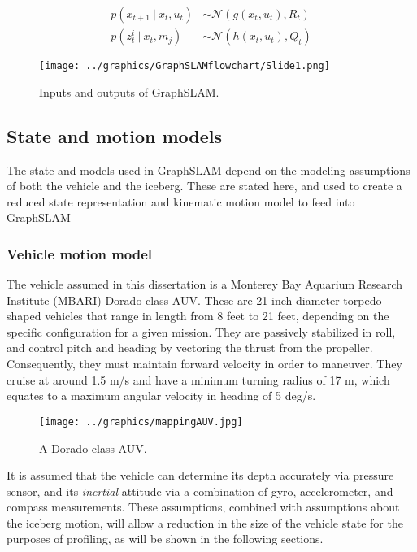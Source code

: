\begin{align}
p\left(x_{t+1}~|~x_t,u_t\right) & \sim \mathcal{N}\left(g(x_t,u_t), R_t\right) \\
p\left(z^i_{t}~|~x_t,m_j\right) & \sim \mathcal{N}\left(h(x_t,u_t), Q_t\right)
\end{align}

\begin{figure}[htb]
   \centering
   \texttt{[image: ../graphics/GraphSLAMflowchart/Slide1.png]} %
   \caption{Inputs and outputs of GraphSLAM.}
   \label{fig:GraphSLAMIO}
\end{figure}

\subsection{State and motion models}

The state and models used in GraphSLAM depend on the modeling assumptions of both the vehicle and the iceberg. These are stated here, and used to create a reduced state representation and kinematic motion model to feed into GraphSLAM

\subsubsection{Vehicle motion model}
\label{sec:VehicleMotion}
The vehicle assumed in this dissertation is a Monterey Bay Aquarium Research Institute (MBARI) Dorado-class AUV. These are 21-inch diameter torpedo-shaped vehicles that range in length from 8 feet to 21 feet, depending on the specific configuration for a given mission. They are passively stabilized in roll, and control pitch and heading by vectoring the thrust from the propeller. Consequently, they must maintain forward velocity in order to maneuver. They cruise at around 1.5 m/s and have a minimum turning radius of 17 m, which equates to a maximum angular velocity in heading of 5 deg/s. \cite{?}

\begin{figure}[htb]
   \centering
   \texttt{[image: ../graphics/mappingAUV.jpg]} %
   \caption{A Dorado-class AUV.}
   \label{fig:mappingAUV}
\end{figure}

It is assumed that the vehicle can determine its depth accurately via pressure sensor, and its \emph{inertial} attitude via a combination of gyro, accelerometer, and compass measurements. These assumptions, combined with assumptions about the iceberg motion, will allow a reduction in the size of the vehicle state for the purposes of profiling, as will be shown in the following sections.

